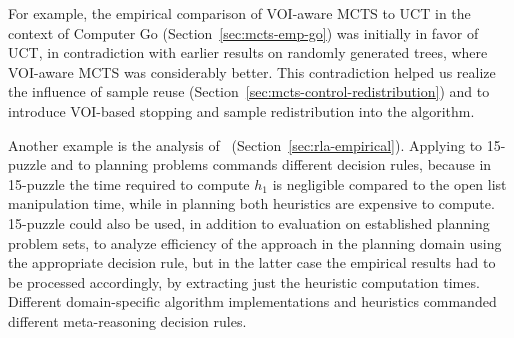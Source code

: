 For example, the empirical comparison of VOI-aware MCTS
to UCT in the context of Computer Go (Section~\ref{sec:mcts-emp-go})
was initially in favor of UCT, in contradiction with earlier results
on randomly generated trees, where VOI-aware MCTS was considerably
better. This contradiction helped us realize the influence of sample
reuse (Section~\ref{sec:mcts-control-redistribution}) and
to introduce VOI-based stopping and sample redistribution into the
algorithm.

Another example is the analysis of
\rationallazyastar~(Section~\ref{sec:rla-empirical}). Applying
\rationallazyastar to 15-puzzle and to planning problems commands
different decision rules, because in 15-puzzle the time required to
compute $h_1$ is negligible compared to the open list manipulation time,
while in planning both heuristics are expensive to compute. 15-puzzle
could also be used, in addition to evaluation on established planning
problem sets, to analyze efficiency of the approach  in the
planning domain using the appropriate decision rule, but in the latter
case the empirical results had to be processed accordingly,
by extracting just the heuristic computation times. Different
domain-specific algorithm implementations and heuristics commanded
different meta-reasoning decision rules.
